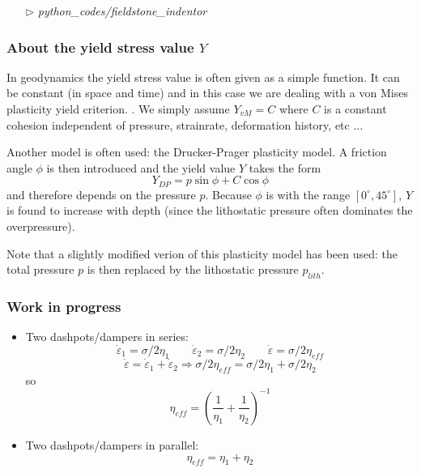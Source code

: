 \begin{mdframed}[backgroundcolor=green!5]
\begin{itemize}
\item[$\triangleright$] {\sl python\_codes/fieldstone\_indentor}
\end{itemize}
\end{mdframed}


\subsubsection{About the yield stress value $Y$}

In geodynamics the yield stress value is often given as a simple function. 
It can be constant (in space and time) and in this case we are dealing with a von Mises plasticity yield criterion. 
. We simply assume $Y_{vM}=C$ where $C$ is a constant cohesion independent of pressure, strainrate,
deformation history, etc ... 

Another model is often used: the Drucker-Prager plasticity model. 
A friction angle $\phi$ is then introduced and the yield value $Y$ takes the form
\[
Y_{DP}=p \sin\phi + C \cos \phi
\]
and therefore depends on the pressure $p$. Because $\phi$ is with the range $[0^\circ,45^\circ]$, $Y$ is
found to increase with depth (since the lithostatic pressure often dominates the overpressure).

Note that a slightly modified verion of this plasticity model has been used: the total pressure $p$
is then replaced by the lithostatic pressure $p_{lith}$.




\subsubsection{Work in progress}

\Literature \cite{zico74,zigo74,zico74b,zien75,corm75,zigo75,zihl75,zijo78,vidm82,vidm84,vede84,zivt85,vimd86}
\cite{wasd97,debo88,debo01,hesd02,bewv11,mumg10,leor89}


\begin{center}
\begin{minipage}[t]{0.5\textwidth}

\end{minipage}
\end{center}
\begin{itemize}
\item Two dashpots/dampers in series: 
\[
\dot{\varepsilon}_1 = \sigma/{2 \eta_1} 
\qquad
\dot{\varepsilon}_2 = \sigma/{2 \eta_2} 
\qquad
\dot{\varepsilon} = \sigma/{2 \eta_{eff}} 
\]
\[
\dot{\varepsilon} = \dot{\varepsilon}_1 + \dot{\varepsilon}_2
\Rightarrow
\sigma/{2 \eta_{eff}} = \sigma/{2 \eta_1} + \sigma/{2 \eta_2} 
\]
so
\[
\eta_{eff} = \left( \frac{1}{\eta_1} + \frac{1}{\eta_2} \right)^{-1}
\]
\item Two dashpots/dampers in parallel: 
\[
\eta_{eff} = \eta_1 + \eta_2
\]
\end{itemize}

